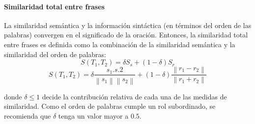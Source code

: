 \paragraph{Similaridad total entre frases}
La similaridad semántica y la información sintáctica (en términos del orden de las palabras) convergen en el significado de la oración. Entonces, la similaridad total entre frases es definida como la combinación de la similaridad semántica y la similaridad del orden de palabras:
\[S(T_1, T_2)=\delta S_s + (1 - \delta)S_r\]
\[S(T_1, T_2)=\delta \frac{s_1.s.2}{\left \| s_1 \right \|\left \| s_2 \right \|} + (1 - \delta)\frac{\left \|r_1-r_2  \right \|}{\left \| r_1+r_2 \right \|}\]

\bigskip donde \(\delta \leq 1\) decide la contribución relativa de cada una de las medidas de similaridad. Como el orden de palabras cumple un rol subordinado, se recomienda que \(\delta\) tenga un valor mayor a \(0.5\).

